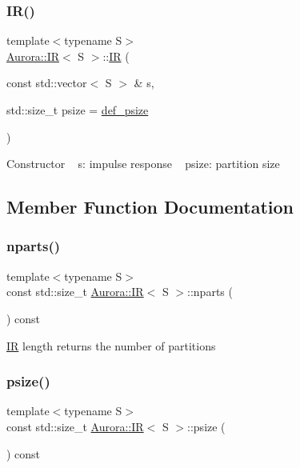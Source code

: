 \subsubsection{\texorpdfstring{I\+R()}{IR()}}
{\footnotesize\ttfamily template$<$typename S$>$ \\
\hyperlink{class_aurora_1_1_i_r}{Aurora\+::\+IR}$<$ S $>$\+::\hyperlink{class_aurora_1_1_i_r}{IR} (\begin{DoxyParamCaption}\item[{const std\+::vector$<$ S $>$ \&}]{s,  }\item[{std\+::size\+\_\+t}]{psize = {\ttfamily \hyperlink{namespace_aurora_a080d03c33477d9c6322278722ca8e472}{def\+\_\+psize}} }\end{DoxyParamCaption})\hspace{0.3cm}{\ttfamily [inline]}}

Constructor ~\newline
s\+: impulse response ~\newline
psize\+: partition size 

\subsection{Member Function Documentation}
\mbox{\label{class_aurora_1_1_i_r_a77d0fec4d82334a2f5533b4c8044c4e1}} 
\subsubsection{\texorpdfstring{nparts()}{nparts()}}
{\footnotesize\ttfamily template$<$typename S$>$ \\
const std\+::size\+\_\+t \hyperlink{class_aurora_1_1_i_r}{Aurora\+::\+IR}$<$ S $>$\+::nparts (\begin{DoxyParamCaption}{ }\end{DoxyParamCaption}) const\hspace{0.3cm}{\ttfamily [inline]}}

\hyperlink{class_aurora_1_1_i_r}{IR} length returns the number of partitions \mbox{\label{class_aurora_1_1_i_r_a6243d747aeccbe57b2e18cb34a806d70}} 
\subsubsection{\texorpdfstring{psize()}{psize()}}
{\footnotesize\ttfamily template$<$typename S$>$ \\
const std\+::size\+\_\+t \hyperlink{class_aurora_1_1_i_r}{Aurora\+::\+IR}$<$ S $>$\+::psize (\begin{DoxyParamCaption}{ }\end{DoxyParamCaption}) const\hspace{0.3cm}{\ttfamily [inline]}}

